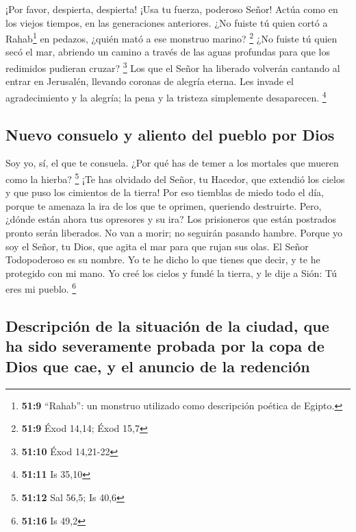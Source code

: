  ¡Por favor, despierta, despierta! ¡Usa tu fuerza,
poderoso Señor! Actúa como en los viejos tiempos, en las generaciones
anteriores. ¿No fuiste tú quien cortó a Rahab\footnote{\textbf{51:9}
  ``Rahab'': un monstruo utilizado como descripción poética de Egipto.}
en pedazos, ¿quién mató a ese monstruo marino? \footnote{\textbf{51:9}
  Éxod 14,14; Éxod 15,7}  ¿No fuiste tú quien secó el
mar, abriendo un camino a través de las aguas profundas para que los
redimidos pudieran cruzar? \footnote{\textbf{51:10} Éxod 14,21-22}
 Los que el Señor ha liberado volverán cantando al entrar
en Jerusalén, llevando coronas de alegría eterna. Les invade el
agradecimiento y la alegría; la pena y la tristeza simplemente
desaparecen. \footnote{\textbf{51:11} Is 35,10}

\hypertarget{nuevo-consuelo-y-aliento-del-pueblo-por-dios}{%
\subsection{Nuevo consuelo y aliento del pueblo por
Dios}\label{nuevo-consuelo-y-aliento-del-pueblo-por-dios}}

 Soy yo, sí, el que te consuela. ¿Por qué has de temer a
los mortales que mueren como la hierba? \footnote{\textbf{51:12} Sal
  56,5; Is 40,6}  ¡Te has olvidado del Señor, tu Hacedor,
que extendió los cielos y que puso los cimientos de la tierra! Por eso
tiemblas de miedo todo el día, porque te amenaza la ira de los que te
oprimen, queriendo destruirte. Pero, ¿dónde están ahora tus opresores y
su ira?  Los prisioneros que están postrados pronto serán
liberados. No van a morir; no seguirán pasando hambre. 
Porque yo soy el Señor, tu Dios, que agita el mar para que rujan sus
olas. El Señor Todopoderoso es su nombre.  Yo te he dicho
lo que tienes que decir, y te he protegido con mi mano. Yo creé los
cielos y fundé la tierra, y le dije a Sión: Tú eres mi pueblo.
\footnote{\textbf{51:16} Is 49,2}

\hypertarget{descripciuxf3n-de-la-situaciuxf3n-de-la-ciudad-que-ha-sido-severamente-probada-por-la-copa-de-dios-que-cae-y-el-anuncio-de-la-redenciuxf3n}{%
\subsection{Descripción de la situación de la ciudad, que ha sido
severamente probada por la copa de Dios que cae, y el anuncio de la
redención}\label{descripciuxf3n-de-la-situaciuxf3n-de-la-ciudad-que-ha-sido-severamente-probada-por-la-copa-de-dios-que-cae-y-el-anuncio-de-la-redenciuxf3n}}

